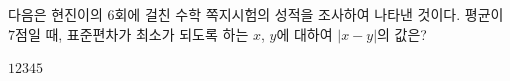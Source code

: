 다음은 현진이의 $6$회에 걸친 수학 쪽지시험의 성적을 조사하여 나타낸 것이다. 평균이 $7$점일 때, 표준편차가 최소가 되도록 하는 $x$, $y$에 대하여 $|x-y|$의 값은? \par\smallskip{}
\begin{choices32}{$1$}{$2$}{$3$}{$4$}{$5$}\end{choices32}

